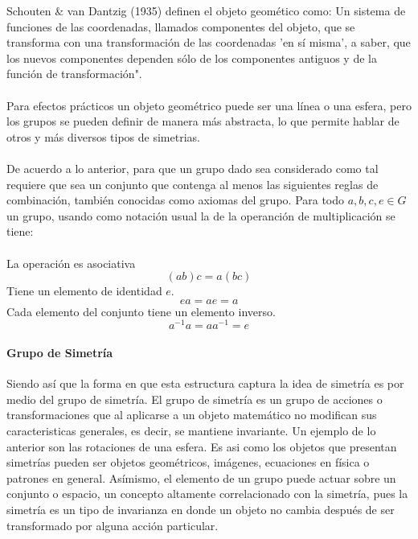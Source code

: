 \documentclass[12pt,letterpaper,final, openany]{scrbook}
\begin{document}
Schouten \& van Dantzig (1935) definen el objeto geomético como:
    Un sistema de funciones de las coordenadas, llamados componentes del objeto, que se transforma con una transformación de las coordenadas 'en sí misma', a saber, que los nuevos componentes dependen sólo de los componentes antiguos y de la función de transformación".
\\
\\
Para efectos prácticos un objeto geométrico puede ser una línea o una esfera, pero los grupos se pueden definir de manera más abstracta, lo que permite hablar de otros y más diversos tipos de simetrias. 
\\
\\
De acuerdo a lo anterior, para que un grupo dado sea considerado como tal requiere que sea un conjunto que contenga al menos las siguientes reglas de combinación, también conocidas como axiomas del grupo. Para todo $a,b,c,e \in G$ un grupo, usando como notación usual la de la operanción de multiplicación se tiene:
\\
\\
La operación es asociativa
\begin{equation}
(ab)c=a(bc)
\end{equation}
Tiene un elemento de identidad $e$.
\begin{equation}
ea=ae=a
\end{equation}
Cada elemento del conjunto tiene un elemento inverso.
\begin{equation}
a^{-1}a=aa^{-1}=e
\end{equation}

\paragraph{Grupo de Simetría}

Siendo así que la forma en que esta estructura captura la idea de simetría es por medio del grupo de simetría. El grupo de simetría es un grupo de acciones o transformaciones que al aplicarse a un objeto matemático no modifican sus caracteristicas generales, es decir, se mantiene invariante. Un ejemplo de lo anterior son las rotaciones de una esfera. Es asi como los objetos que presentan simetrías pueden ser objetos geométricos, imágenes, ecuaciones en física o patrones en general. Asímismo, el elemento de un grupo puede actuar sobre un conjunto o espacio, un concepto altamente correlacionado con la simetría, pues la simetría es un tipo de invarianza en donde un objeto no cambia después de ser transformado por alguna acción particular.
\end{document}
